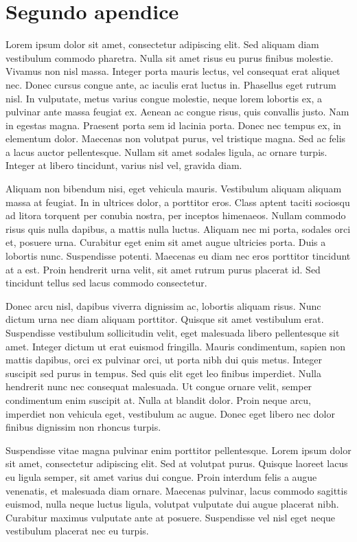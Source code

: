 \chapter{Segundo apendice}\label{aped.B}


Lorem ipsum dolor sit amet, consectetur adipiscing elit. Sed aliquam diam vestibulum commodo pharetra. Nulla sit amet risus eu purus finibus molestie. Vivamus non nisl massa. Integer porta mauris lectus, vel consequat erat aliquet nec. Donec cursus congue ante, ac iaculis erat luctus in. Phasellus eget rutrum nisl. In vulputate, metus varius congue molestie, neque lorem lobortis ex, a pulvinar ante massa feugiat ex. Aenean ac congue risus, quis convallis justo. Nam in egestas magna. Praesent porta sem id lacinia porta. Donec nec tempus ex, in elementum dolor. Maecenas non volutpat purus, vel tristique magna. Sed ac felis a lacus auctor pellentesque. Nullam sit amet sodales ligula, ac ornare turpis. Integer at libero tincidunt, varius nisl vel, gravida diam.

Aliquam non bibendum nisi, eget vehicula mauris. Vestibulum aliquam aliquam massa at feugiat. In in ultrices dolor, a porttitor eros. Class aptent taciti sociosqu ad litora torquent per conubia nostra, per inceptos himenaeos. Nullam commodo risus quis nulla dapibus, a mattis nulla luctus. Aliquam nec mi porta, sodales orci et, posuere urna. Curabitur eget enim sit amet augue ultricies porta. Duis a lobortis nunc. Suspendisse potenti. Maecenas eu diam nec eros porttitor tincidunt at a est. Proin hendrerit urna velit, sit amet rutrum purus placerat id. Sed tincidunt tellus sed lacus commodo consectetur.

Donec arcu nisl, dapibus viverra dignissim ac, lobortis aliquam risus. Nunc dictum urna nec diam aliquam porttitor. Quisque sit amet vestibulum erat. Suspendisse vestibulum sollicitudin velit, eget malesuada libero pellentesque sit amet. Integer dictum ut erat euismod fringilla. Mauris condimentum, sapien non mattis dapibus, orci ex pulvinar orci, ut porta nibh dui quis metus. Integer suscipit sed purus in tempus. Sed quis elit eget leo finibus imperdiet. Nulla hendrerit nunc nec consequat malesuada. Ut congue ornare velit, semper condimentum enim suscipit at. Nulla at blandit dolor. Proin neque arcu, imperdiet non vehicula eget, vestibulum ac augue. Donec eget libero nec dolor finibus dignissim non rhoncus turpis.

Suspendisse vitae magna pulvinar enim porttitor pellentesque. Lorem ipsum dolor sit amet, consectetur adipiscing elit. Sed at volutpat purus. Quisque laoreet lacus eu ligula semper, sit amet varius dui congue. Proin interdum felis a augue venenatis, et malesuada diam ornare. Maecenas pulvinar, lacus commodo sagittis euismod, nulla neque luctus ligula, volutpat vulputate dui augue placerat nibh. Curabitur maximus vulputate ante at posuere. Suspendisse vel nisl eget neque vestibulum placerat nec eu turpis.

